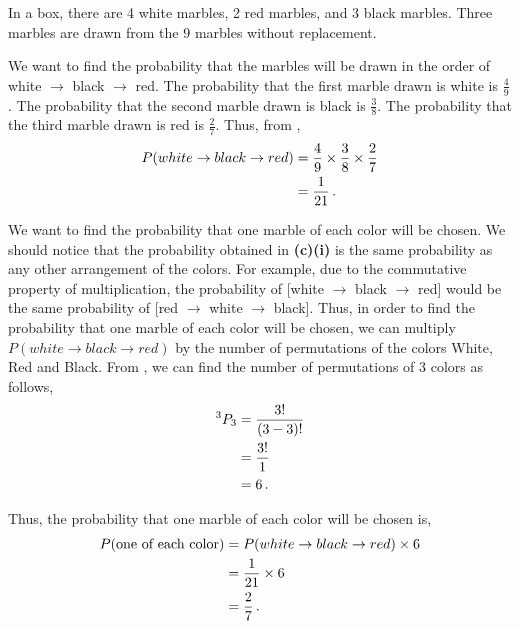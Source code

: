 \begin{subquestions}

\subquestion

In a box, there are 4 white marbles, 2 red marbles, and 3 black marbles. Three marbles are drawn from the 9 marbles without replacement.  

\begin{subsubquestions}
	
\subsubquestion

We want to find the probability that the marbles will be drawn in the order of white $\rightarrow$ black $\rightarrow$ red. The probability that the first marble drawn is white is $\frac{4}{9}$. The probability that the second marble drawn is black is $\frac{3}{8}$. The probability that the third marble drawn is red is $\frac{2}{7}$. Thus, from , 
\begin{align}
	P(white \rightarrow black \rightarrow red) & = \frac{4}{9} \times \frac{3}{8} \times \frac{2}{7} \nonumber \\
	                                           & = \frac{1}{21} \,.
\end{align}
	

\subsubquestion

We want to find the probability that one marble of each color will be chosen. We should notice that the probability obtained in \textbf{(c)(i)} is the same probability as any other arrangement of the colors. For example, due to the commutative property of multiplication, the probability of [white $\rightarrow$ black $\rightarrow$ red] would be the same probability of [red $\rightarrow$ white $\rightarrow$ black]. Thus, in order to find the probability that one marble of each color will be chosen, we can multiply $P(white \rightarrow black \rightarrow red)$ by the number of permutations of the colors White, Red and Black. From , we can find the number of permutations of 3 colors as follows,
\begin{align}
	^3P_3 & = \frac{3!}{(3-3)!} \nonumber \\
	      & = \frac{3!}{1} \nonumber \\
	      & = 6 \,.
\end{align}

Thus, the probability that one marble of each color will be chosen is,
\begin{align}
	P(\text{one of each color}) & = P(white \rightarrow black \rightarrow red) \times 6 \nonumber \\
	                     & = \frac{1}{21} \times 6 \nonumber \\
	                     & = \frac{2}{7} \,.
\end{align}


\end{subsubquestions}
\end{subquestions}
